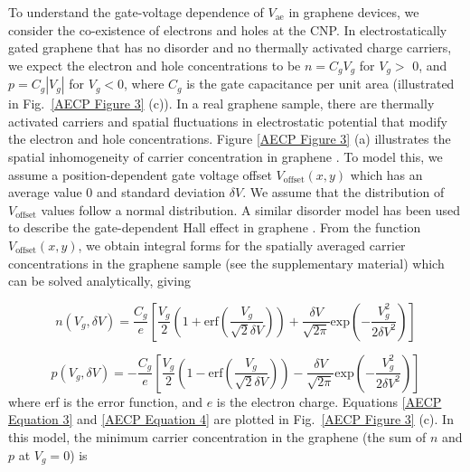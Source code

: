 \documentclass{beavtex_dub_edit}
\begin{document}
To understand the gate-voltage dependence of $V_{\mathrm{ae}}$ in graphene devices, we consider the co-existence of electrons and holes at the CNP. In electrostatically gated graphene that has no disorder and no thermally activated charge carriers, we expect the electron and hole concentrations to be $n = C_g V_g$ for $V_g >$ 0, and $p = C_g |V_g|$ for $V_g < 0$, where $C_g$ is the gate capacitance per unit area (illustrated in Fig.\ \ref{AECP Figure 3} (c)). In a real graphene sample, there are thermally activated carriers and spatial fluctuations in electrostatic potential that modify the electron and hole concentrations. Figure \ref{AECP Figure 3} (a) illustrates the spatial inhomogeneity of carrier concentration in graphene \cite{martin_observation_2008}. To model this, we assume a position-dependent gate voltage offset $V_{\mathrm{offset}}(x,y)$ which has an average value 0 and standard deviation $\delta V$. We assume that the distribution of $V_{\mathrm{offset}}$ values follow a normal distribution. A similar disorder model has been used to describe the gate-dependent Hall effect in graphene \cite{brown_hall_2019}. From the function $V_{\mathrm{offset}}(x,y)$, we obtain integral forms for the spatially averaged carrier concentrations in the graphene sample (see the supplementary material) which can be solved analytically, giving


\begin{equation}
    n(V_g, \delta V) = \frac{C_g}{e}\left[\frac{V_g}{2}\left(1+\mathrm{erf}\left(\frac{V_g}{\sqrt{2}\delta V}\right)\right)+\frac{\delta V}{\sqrt{2\pi}}\mathrm{exp}\left(-\frac{V_g^2}{2\delta V^2}\right)\right]
    \label{AECP Equation 3}
\end{equation}

\begin{equation}
    p(V_g, \delta V) = -\frac{C_g}{e}\left[\frac{V_g}{2}\left(1-\mathrm{erf}\left(\frac{V_g}{\sqrt{2}\delta V}\right)\right)-\frac{\delta V}{\sqrt{2\pi}}\mathrm{exp}\left(-\frac{V_g^2}{2\delta V^2}\right)\right]
    \label{AECP Equation 4}
\end{equation}
where erf is the error function, and $e$ is the electron charge. Equations \ref{AECP Equation 3} and \ref{AECP Equation 4} are plotted in Fig.\ \ref{AECP Figure 3} (c). In this model, the minimum carrier concentration in the graphene (the sum of $n$ and $p$ at $V_g = 0$) is 
\end{document}
